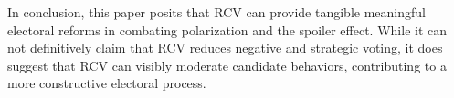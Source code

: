In conclusion, this paper posits that RCV can provide tangible meaningful electoral reforms in combating polarization and the spoiler effect. While it can not definitively claim that RCV reduces negative and strategic voting, it does suggest that RCV can visibly moderate candidate behaviors, contributing to a more constructive electoral process.
